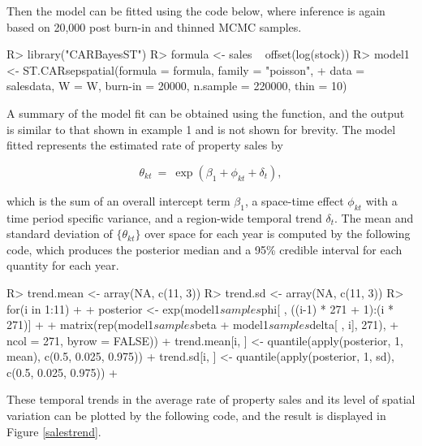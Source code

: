 \documentclass[article, nojss]{jss}
\begin{document}
\begin{Schunk}
\end{Schunk}

Then the model can be fitted using the code below, where inference is again based on 20,000 post burn-in and thinned MCMC samples.  


\begin{CodeInput}
R> library("CARBayesST")
R> formula <- sales ~ offset(log(stock))
R> model1 <- ST.CARsepspatial(formula = formula, family = "poisson", 
+     data = salesdata, W = W, burn-in = 20000, n.sample = 220000, thin = 10)
\end{CodeInput}


A summary of the model fit can be obtained using the  function, and the output is similar to that shown in example 1 and is not shown for brevity. The model fitted represents the estimated rate of property sales by

$$\theta_{kt}~=~\exp(\beta_1 + \phi_{kt} + \delta_t),$$

which is the sum of an overall intercept term $\beta_1$, a space-time effect $\phi_{kt}$ with a time period specific variance, and a region-wide temporal trend $\delta_t$. The mean and standard deviation of $\{\theta_{kt}\}$ over space for each year is computed by the following code, which produces the posterior median and a 95\% credible interval for each quantity for each year.


\begin{CodeInput}
R> trend.mean <- array(NA, c(11, 3))
R> trend.sd <- array(NA, c(11, 3))
R>   for(i in 1:11)
+    {
+    posterior <- exp(model1$samples$phi[ , ((i-1) * 271 + 1):(i * 271)] + 
+       matrix(rep(model1$samples$beta + model1$samples$delta[ , i], 271), 
+       ncol = 271, byrow = FALSE))
+    trend.mean[i, ] <- quantile(apply(posterior, 1, mean), 
        c(0.5, 0.025, 0.975))
+    trend.sd[i, ] <- quantile(apply(posterior, 1, sd), c(0.5, 0.025, 0.975))
+    }
\end{CodeInput}

These temporal trends in the average rate of property sales and its level of spatial variation can be plotted by the following code, and the result is displayed in Figure \ref{salestrend}.
\end{document}
